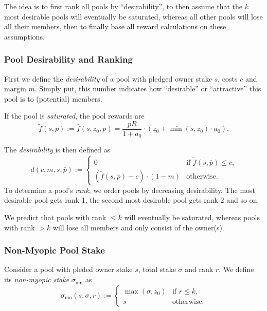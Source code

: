 \documentclass[11pt,a4paper,dvipsnames,twosided]{article}
\newcommand\pbar{\overline{p}}
\begin{document}
The idea is to first rank all pools by ``desirability'', to then assume
that the \(k\) most desirable pools will eventually be saturated,
whereas all other pools will lose all their members, then to finally
base all reward calculations on these assumptions.

\subsubsection{Pool Desirability and Ranking}
\label{pool-desirability-and-ranking}

First we define the \emph{desirability} of a pool with pledged owner stake
\(s\), costs \(c\) and margin \(m\). Simply put, this number indicates how
``desirable'' or ``attractive'' this pool is to (potential) members.

If the pool is \emph{saturated}, the pool rewards are \[
    \tilde{f}(s, \pbar) :=
    \hat{f}(s,z_0,\pbar)=
    \frac{\pbar R}{1 + a_0}
    \cdot
    \left(z_0 + \min(s,z_0)\cdot a_0\right).
\]

The \emph{desirability} is then defined as \[
    d(c, m, s, \pbar) :=
    \left\{
    \begin{array}{ll}
        \displaystyle 0 &
        \text{if $\tilde{f}(s,\pbar)\leq c$,} \\
        \displaystyle\left(\tilde{f}(s,\pbar) - c\right)\cdot(1-m) &
        \text{otherwise.}
    \end{array}
    \right.
\] To determine a pool's \emph{rank}, we order pools by decreasing
desirability. The most desirable pool gets rank 1, the second most
desirable pool gets rank 2 and so on.

We predict that pools with rank \(\leq k\) will eventually be saturated,
whereas pools with rank \(>k\) will lose all members and only consist of
the owner(s).

\subsubsection{Non-Myopic Pool Stake}
\label{non-myopic-pool-stake}

Consider a pool with pleded owner stake \(s\), total stake \(\sigma\) and rank
\(r\). We define its \emph{non-myopic stake} \(\sigma_\mathrm{nm}\) as
\[
    \sigma_\mathrm{nm}(s,\sigma,r) :=
    \left\{
    \begin{array}{ll}
        \max(\sigma,z_0) &
        \text{if $r\leq k$,} \\
        s &
        \text{otherwise.}
    \end{array}
    \right.
\]
\end{document}
